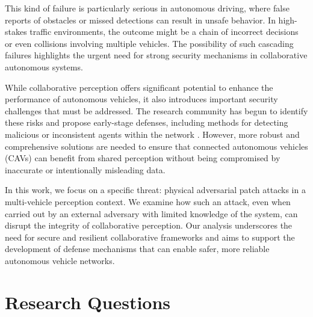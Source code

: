 This kind of failure is particularly serious in autonomous driving, where false reports of obstacles or missed detections can result in unsafe behavior. In high-stakes traffic environments, the outcome might be a chain of incorrect decisions or even collisions involving multiple vehicles. The possibility of such cascading failures highlights the urgent need for strong security mechanisms in collaborative autonomous systems.

While collaborative perception offers significant potential to enhance the performance of autonomous vehicles, it also introduces important security challenges that must be addressed. The research community has begun to identify these risks and propose early-stage defenses, including methods for detecting malicious or inconsistent agents within the network \cite{10.1007978-3-030-58536-5_36} \cite{96294f63afd44ccd9210824e1aa2656c} \cite{hu2022where2commcommunicationefficientcollaborativeperception} \cite{6a619c52e2df4c96ac051544a08e266d}. However, more robust and comprehensive solutions are needed to ensure that connected autonomous vehicles (CAVs) can benefit from shared perception without being compromised by inaccurate or intentionally misleading data.

In this work, we focus on a specific threat: physical adversarial patch attacks in a multi-vehicle perception context. We examine how such an attack, even when carried out by an external adversary with limited knowledge of the system, can disrupt the integrity of collaborative perception. Our analysis underscores the need for secure and resilient collaborative frameworks and aims to support the development of defense mechanisms that can enable safer, more reliable autonomous vehicle networks.

\section{Research Questions}

